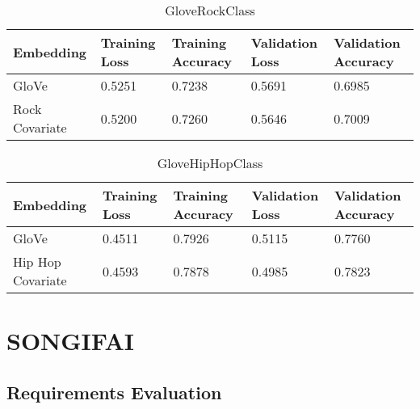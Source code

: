 \begin{table}[ht]
	\centering
	\begin{tabular}{ | p{3cm} | p{2cm} | p{2cm} | p{2cm} | p{2cm} |}
		\hline
		\textbf{Embedding} & \textbf{Training Loss} & \textbf{Training Accuracy} & \textbf{Validation Loss} & \textbf{Validation Accuracy}\\ \hline
		GloVe & 0.5251 & 0.7238 & 0.5691 & 0.6985\\ \hline
		Rock Covariate & 0.5200 & 0.7260 & 0.5646 & 0.7009\\ \hline
	\end{tabular}
	\label{Tab:GloveRockClass}
	\caption{GloveRockClass}
\end{table}

\begin{table}[ht]
	\centering
	\begin{tabular}{ | p{3cm} | p{2cm} | p{2cm} | p{2cm} | p{2cm} |}
		\hline
		\textbf{Embedding} & \textbf{Training Loss} & \textbf{Training Accuracy} & \textbf{Validation Loss} & \textbf{Validation Accuracy}\\ \hline
		GloVe & 0.4511 & 0.7926 & 0.5115 & 0.7760\\ \hline
		Hip Hop Covariate & 0.4593 & 0.7878 & 0.4985 & 0.7823\\ \hline
	\end{tabular}
	\label{Tab:GloveHipHopClass}
	\caption{GloveHipHopClass}
\end{table}
\section{SONGIFAI}
\subsection{Requirements Evaluation}
